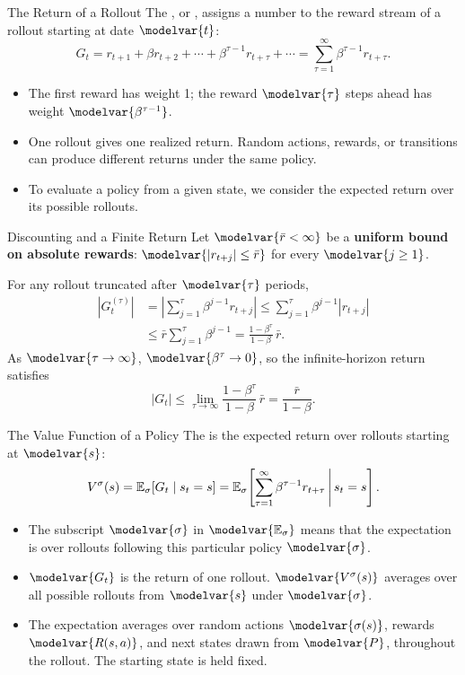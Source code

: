 \begin{frame}{The Return of a Rollout}
The , or , assigns a number to the reward stream of a rollout starting at date \(\modelvar{t}\):
\[G_t=r_{t+1}+\beta r_{t+2}+\cdots+\beta^{\tau-1}r_{t+\tau}+\cdots
 =\sum_{\tau=1}^{\infty}\beta^{\tau-1}r_{t+\tau}.\]
\begin{itemize}
\item The first reward has weight 1; the reward \(\modelvar{\tau}\) steps ahead has weight \(\modelvar{\beta^{\tau-1}}\).
\item One rollout gives one realized return. Random actions, rewards, or transitions can produce different returns under the same policy.
\item To evaluate a policy from a given state, we consider the expected return over its possible rollouts.
\end{itemize}
\end{frame}

\begin{frame}{Discounting and a Finite Return}
Let \(\modelvar{\bar r<\infty}\) be a \textbf{uniform bound on absolute rewards}: \(\modelvar{|r_{t+j}|\leq\bar r}\) for every \(\modelvar{j\geq1}\).
\par\medskip
For any rollout truncated after \(\modelvar{\tau}\) periods,
\begin{align*}
\left|G_t^{(\tau)}\right|
 &=\left|\sum_{j=1}^{\tau}\beta^{j-1}r_{t+j}\right|
 \leq\sum_{j=1}^{\tau}\beta^{j-1}|r_{t+j}|\\
 &\leq\bar r\sum_{j=1}^{\tau}\beta^{j-1}
 =\frac{1-\beta^\tau}{1-\beta}\,\bar r.
\end{align*}
As \(\modelvar{\tau\to\infty}\), \(\modelvar{\beta^\tau\to0}\), so the infinite-horizon return satisfies
\[|G_t|\leq\lim_{\tau\to\infty}\frac{1-\beta^\tau}{1-\beta}\,\bar r
 =\frac{\bar r}{1-\beta}.\]
\end{frame}

\begin{frame}{The Value Function of a Policy}
The  is the expected return over rollouts starting at \(\modelvar{s}\):
\[V^\sigma(s)=\mathbb E_\sigma[G_t\mid s_t=s]
 =\mathbb E_\sigma\!\left[\sum_{\tau=1}^{\infty}\beta^{\tau-1}r_{t+\tau}\,\middle|\,s_t=s\right].\]
\begin{itemize}
\item The subscript \(\modelvar{\sigma}\) in \(\modelvar{\E_\sigma}\) means that the expectation is over rollouts following this particular policy \(\modelvar{\sigma}\).
\item \(\modelvar{G_t}\) is the return of one rollout. \(\modelvar{V^\sigma(s)}\) averages over all possible rollouts from \(\modelvar{s}\) under \(\modelvar{\sigma}\).
\item The expectation averages over random actions \(\modelvar{\sigma(s)}\), rewards \(\modelvar{R(s,a)}\), and next states drawn from \(\modelvar{P}\), throughout the rollout. The starting state is held fixed.
\end{itemize}
\end{frame}

